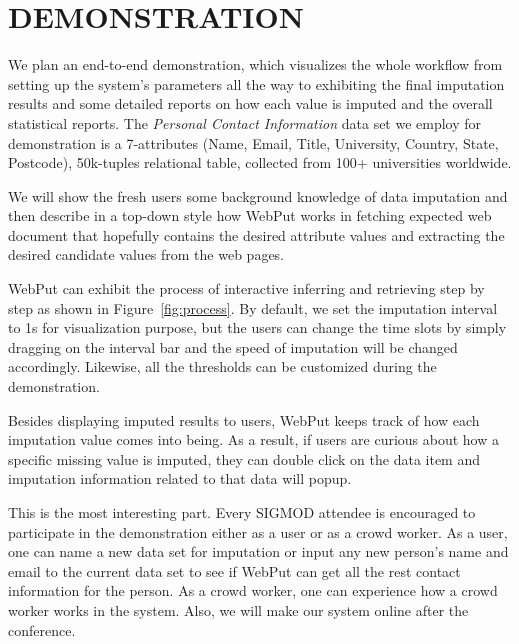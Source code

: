 \documentclass[sigconf]{acmart}
\begin{document}
\section{DEMONSTRATION}
We plan an end-to-end demonstration, which visualizes the whole workflow from setting up the system's parameters all the way to exhibiting the final imputation results and some detailed reports on how each value is imputed and the overall statistical reports.
%
The {\em Personal Contact Information} data set we employ for demonstration is a 7-attributes (Name, Email, Title, University, Country, State, Postcode), 50k-tuples relational table, collected from 100+ universities worldwide.

We will show the fresh users some background knowledge of data imputation and then describe in a top-down style how WebPut works in fetching expected web document that hopefully contains the desired attribute values and extracting the desired candidate values from the web pages.

WebPut can exhibit the process of interactive inferring and retrieving step by step as shown in Figure~\ref{fig:process}. By default, we set the imputation interval to 1s for visualization purpose, but the users can change the time slots by simply dragging on the interval bar and the speed of imputation will be changed accordingly. Likewise, all the thresholds can be customized during the demonstration.

 Besides displaying imputed results to users, WebPut keeps track of how each imputation value comes into being. As a result, if users are curious about how a specific missing value is imputed, they can double click on the data item and imputation information related to that data will popup. %

This is the most interesting part. Every SIGMOD attendee is encouraged to participate in the demonstration either as a user or as a crowd worker. As a user, one can name a new data set for imputation or input any new person's name and email to the current data set to see if WebPut can get all the rest contact information for the person. As a crowd worker, one can experience how a crowd worker works in the system.
%
Also, we will make our system online after the conference.



\end{document}
